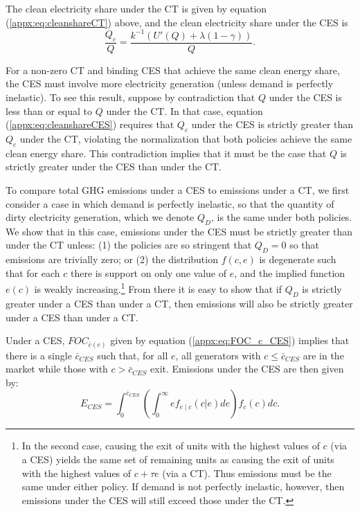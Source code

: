 \documentclass[12pt]{article}
\begin{document}
The clean electricity share under the CT is given by equation (\ref{appx:eq:cleanshareCT}) above, and the clean electricity share under the CES is 
\begin{equation}
    \frac{Q_c}{Q} = \frac{k^{-1}(U'(Q)+\lambda(1-\gamma))}{Q}. \label{appx:eq:cleanshareCES}
\end{equation}

For a non-zero CT and binding CES that achieve the same clean energy share, the CES must involve more electricity generation (unless demand is perfectly inelastic). To see this result, suppose by contradiction that $Q$ under the CES is less than or equal to $Q$ under the CT. In that case, equation (\ref{appx:eq:cleanshareCES}) requires that $Q_c$ under the CES is strictly greater than $Q_c$ under the CT, violating the normalization that both policies achieve the same clean energy share. This contradiction implies that it must be the case that $Q$ is strictly greater under the CES than under the CT.

To compare total GHG emissions under a CES to emissions under a CT, we first consider a case in which demand is perfectly inelastic, so that the quantity of dirty electricity generation, which we denote $Q_D$, is the same under both policies. We show that in this case, emissions under the CES must be strictly greater than under the CT unless: (1) the policies are so stringent that $Q_D=0$ so that emissions are trivially zero; or (2) the distribution $f(c,e)$ is degenerate such that for each $c$ there is support on only one value of $e$, and the implied function $e(c)$ is weakly increasing.\footnote{In the second case, causing the exit of units with the highest values of $c$ (via a CES) yields the same set of remaining units as causing the exit of units with the highest values of $c+\tau e$ (via a CT). Thus emissions must be the same under either policy. If demand is not perfectly inelastic, however, then emissions under the CES will still exceed those under the CT.} From there it is easy to show that if $Q_D$ is strictly greater under a CES than under a CT, then emissions will also be strictly greater under a CES than under a CT.

Under a CES, $FOC_{\bar{c}(e)}$ given by equation (\ref{appx:eq:FOC_c_CES}) implies that there is a single $\bar{c}_{CES}$ such that, for all $e$, all generators with $c\leq\bar{c}_{CES}$ are in the market while those with $c>\bar{c}_{CES}$ exit. Emissions under the CES are then given by:
\begin{equation}
    E_{CES} = \int_0^{\bar{c}_{CES}}\left(\int_0^\infty ef_{e\mid c}(c|e)de\right)f_c(c)dc. \label{appx:eq:emissionsCES}
\end{equation}
\end{document}
